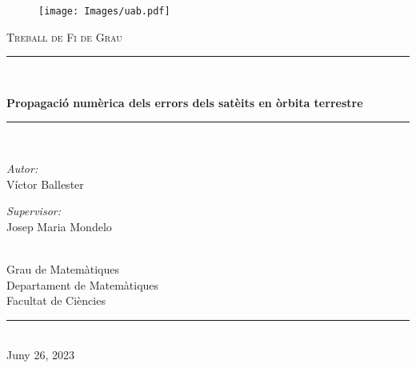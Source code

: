 \documentclass[twoside]{article}
\renewcommand\title{Propagació numèrica dels errors dels satè\lgem its en òrbita terrestre}
\renewcommand\author{Víctor Ballester}
\renewcommand\date{Juny 26, 2023}
\newcommand\supervisor{Josep Maria Mondelo}
\newcommand\faculty{Facultat de Ciències}
\newcommand\department{Departament de Matemàtiques}
\newcommand\degree{Grau de Matemàtiques}
\begin{document}
\begin{titlepage}
  \begin{center}
    \vspace*{1in}
    \begin{figure}[H]
      \begin{center}
        \texttt{[image: Images/uab.pdf]}
      \end{center}
    \end{figure}
    \vspace*{1.5cm}
    \textsc{\Large Treball de Fi de Grau}\\[0.75cm]
    \rule{150mm}{0.1mm}\\[0.4cm]
    {\huge \bfseries \title\par}
    \vspace{0.4cm} %
    \rule{150mm}{0.1mm} \\[1.5cm] %
    \begin{minipage}[ht]{0.4\textwidth}
      \begin{flushleft} \large
        \emph{Autor:}\\[0.2cm]
        \author %
      \end{flushleft}
    \end{minipage}
    \begin{minipage}[ht]{0.4\textwidth}
      \begin{flushright} \large
        \emph{Supervisor:} \\[0.2cm]
        \supervisor %
      \end{flushright}
    \end{minipage}\\[3cm]
    \vfill
    {\large
      \degree\\[0.2cm]
      \department\\[0.2cm]
      \faculty\\[0.5cm]
    }
    \rule{80mm}{0.1mm}\\[0.5cm]
    {\large \date}\\[0.2cm]
    \vfill
  \end{center}
  \newpage
\end{titlepage}
\thispagestyle{empty}
\end{document}
